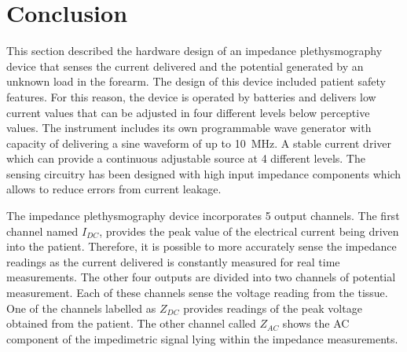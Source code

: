 \section{Conclusion}
\label{conclusion impedance device}
This section described the hardware design of an impedance plethysmography device that senses the current delivered and the potential generated by an unknown load in the forearm. The design of this device included patient safety features. For this reason, the device is operated by batteries and delivers low current values that can be adjusted in four different levels below perceptive values. The instrument includes its own programmable wave generator with capacity of delivering a sine waveform of up to \SI{10}{\mega\hertz}. A stable current driver which can provide a continuous adjustable source at 4 different levels. The sensing circuitry has been designed with high input impedance components which allows to reduce errors from current leakage.

The impedance plethysmography device incorporates 5 output channels. The first channel named $I_{DC}$, provides the peak value of the electrical current being driven into the patient. Therefore, it is possible to more accurately sense the impedance readings as the current delivered is constantly measured for real time measurements. The other four outputs are divided into two channels of potential measurement. Each of these channels sense the voltage reading from the tissue. One of the channels labelled as $Z_{DC}$ provides readings of the peak voltage obtained from the patient. The other channel called $Z_{AC}$ shows the AC component of the impedimetric signal lying within the impedance measurements.  


